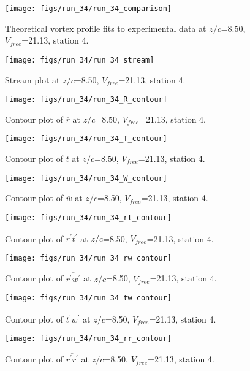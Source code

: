 \begin{figure}[H]
\centering
\texttt{[image: figs/run\_34/run\_34\_comparison]}
\caption{Theoretical vortex profile fits to experimental data at $z/c$=8.50, $V_{free}$=21.13, station 4.}
\end{figure}


\begin{figure}[H]
\centering
\texttt{[image: figs/run\_34/run\_34\_stream]}
\caption{Stream plot at $z/c$=8.50, $V_{free}$=21.13, station 4.}
\end{figure}


\begin{figure}[H]
\centering
\texttt{[image: figs/run\_34/run\_34\_R\_contour]}
\caption{Contour plot of $\overline{r}$ at $z/c$=8.50, $V_{free}$=21.13, station 4.}
\end{figure}


\begin{figure}[H]
\centering
\texttt{[image: figs/run\_34/run\_34\_T\_contour]}
\caption{Contour plot of $\overline{t}$ at $z/c$=8.50, $V_{free}$=21.13, station 4.}
\end{figure}


\begin{figure}[H]
\centering
\texttt{[image: figs/run\_34/run\_34\_W\_contour]}
\caption{Contour plot of $\overline{w}$ at $z/c$=8.50, $V_{free}$=21.13, station 4.}
\end{figure}


\begin{figure}[H]
\centering
\texttt{[image: figs/run\_34/run\_34\_rt\_contour]}
\caption{Contour plot of $\overline{r^\prime t^\prime}$ at $z/c$=8.50, $V_{free}$=21.13, station 4.}
\end{figure}


\begin{figure}[H]
\centering
\texttt{[image: figs/run\_34/run\_34\_rw\_contour]}
\caption{Contour plot of $\overline{r^\prime w^\prime}$ at $z/c$=8.50, $V_{free}$=21.13, station 4.}
\end{figure}


\begin{figure}[H]
\centering
\texttt{[image: figs/run\_34/run\_34\_tw\_contour]}
\caption{Contour plot of $\overline{t^\prime w^\prime}$ at $z/c$=8.50, $V_{free}$=21.13, station 4.}
\end{figure}


\begin{figure}[H]
\centering
\texttt{[image: figs/run\_34/run\_34\_rr\_contour]}
\caption{Contour plot of $\overline{r^\prime r^\prime}$ at $z/c$=8.50, $V_{free}$=21.13, station 4.}
\end{figure}


